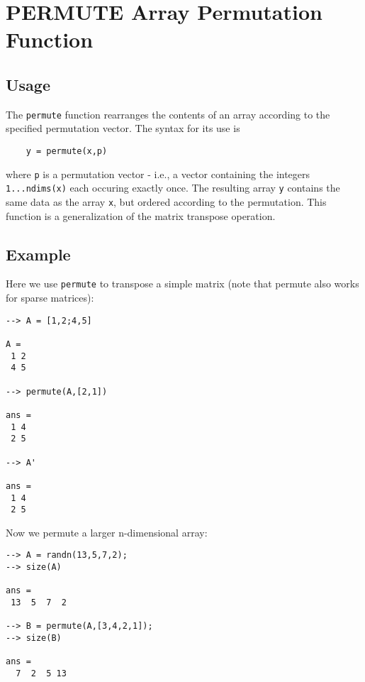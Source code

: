 \section{PERMUTE Array Permutation Function}

\subsection{Usage}

The \verb|permute| function rearranges the contents of an array according
to the specified permutation vector.  The syntax for its use is
\begin{verbatim}
    y = permute(x,p)
\end{verbatim}
where \verb|p| is a permutation vector - i.e., a vector containing the 
integers \verb|1...ndims(x)| each occuring exactly once.  The resulting
array \verb|y| contains the same data as the array \verb|x|, but ordered
according to the permutation.  This function is a generalization of
the matrix transpose operation.
\subsection{Example}

Here we use \verb|permute| to transpose a simple matrix (note that permute
also works for sparse matrices):
\begin{verbatim}
--> A = [1,2;4,5]

A = 
 1 2 
 4 5 

--> permute(A,[2,1])

ans = 
 1 4 
 2 5 

--> A'

ans = 
 1 4 
 2 5 
\end{verbatim}
Now we permute a larger n-dimensional array:
\begin{verbatim}
--> A = randn(13,5,7,2);
--> size(A)

ans = 
 13  5  7  2 

--> B = permute(A,[3,4,2,1]);
--> size(B)

ans = 
  7  2  5 13 
\end{verbatim}
